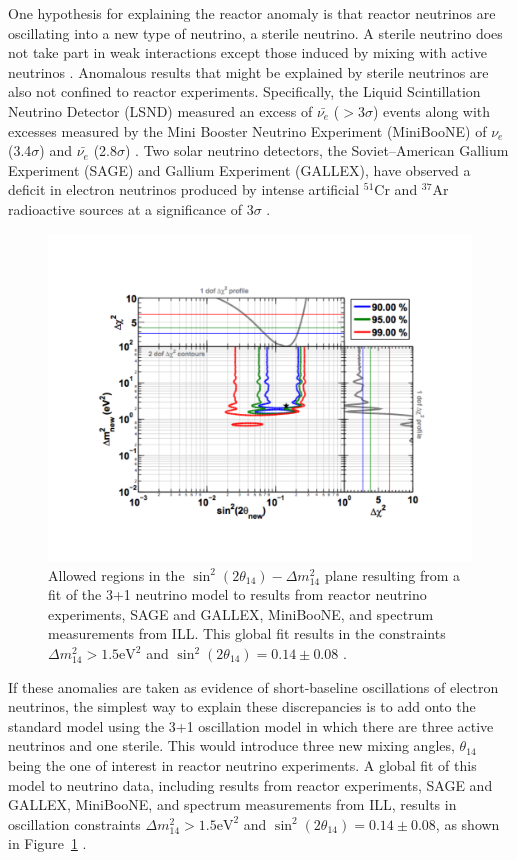 One hypothesis for explaining the reactor anomaly is that reactor neutrinos are oscillating into a new type of neutrino, a sterile neutrino. 
A sterile neutrino does not take part in weak interactions except those induced by mixing with active neutrinos \cite{Abazajian:2012ys}. 
Anomalous results that might be explained by sterile neutrinos are also not confined to reactor experiments.  
Specifically, the Liquid Scintillation Neutrino Detector (LSND)  measured an excess of $\bar{\nu_{e}}$ ($>$3$\sigma$) events \cite{Aguilar:2001ty} along with excesses measured by the Mini Booster Neutrino Experiment (MiniBooNE) of $\nu_{e}$ (3.4$\sigma$) and $\bar{\nu_{e}}$ (2.8$\sigma$) \cite{Aguilar-Arevalo:2013pmq}.
Two solar neutrino detectors, the Soviet–American Gallium Experiment (SAGE) and Gallium Experiment (GALLEX), have observed a deficit in electron neutrinos produced by intense artificial $^{51}$Cr and $^{37}$Ar radioactive sources at a significance of 3$\sigma$ \cite{Giunti:2010zu}.

\begin{figure}[!t]
	\centering
	\includegraphics[width=0.7\linewidth]{tex/3-reactorneutrinos-images/RAA_BestFitPoint}
	\caption[]{Allowed regions in the $\sin^2(2\theta_{14})-\Delta m^2_{14}$ plane resulting from a fit of the 3+1 neutrino model to results from reactor neutrino experiments, SAGE and GALLEX, MiniBooNE, and spectrum measurements from ILL. This global fit results in the constraints $\Delta m^2_{14} > 1.5 \textrm{eV}^2$ and $\sin^2(2\theta_{14}) = 0.14 \pm 0.08$ \cite{Mention:2011rk}.}
	\label{fig:raabestfitpoint}
\end{figure}

If these anomalies are taken as evidence of short-baseline oscillations of electron neutrinos, the simplest way to explain these discrepancies is to add onto the standard model using the 3+1 oscillation model in which there are three active neutrinos and one sterile. This would introduce three new mixing angles, $\theta_{14}$ being the one of interest in reactor neutrino experiments.
A global fit of this model to neutrino data, including results from reactor experiments, SAGE and GALLEX, MiniBooNE, and spectrum measurements from ILL, results in oscillation constraints $\Delta m^2_{14} > 1.5 \textrm{eV}^2$ and $\sin^2(2\theta_{14}) = 0.14 \pm 0.08$, as shown in Figure~\ref{fig:raabestfitpoint} \cite{Mention:2011rk}.


